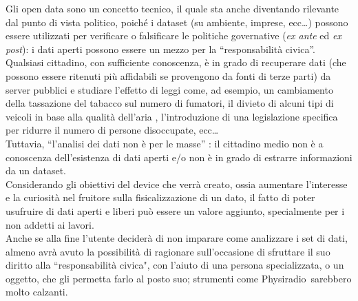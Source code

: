 \documentclass[12pt,a4paper]{report}
\newcommand{\physiradio}{Physiradio} %
\begin{document}
Gli open data sono un concetto tecnico, il quale sta anche diventando rilevante dal punto di vista politico, poiché i dataset (su ambiente, imprese, ecc\dots) possono essere utilizzati per verificare o falsificare le politiche governative (\textit{ex ante} ed \textit{ex post}): i dati aperti possono essere un mezzo per la ``responsabilità civica''. %
Qualsiasi cittadino, con sufficiente conoscenza, è in grado di recuperare dati (che possono essere ritenuti più affidabili se provengono da fonti di terze parti) da server pubblici e studiare l'effetto di leggi come, ad esempio, un cambiamento della tassazione del tabacco sul numero di fumatori, il divieto di alcuni tipi di veicoli in base alla qualità dell'aria \cite{trentini2014lombardy}, l'introduzione di una legislazione specifica per ridurre il numero di persone disoccupate, ecc\dots\ \\


Tuttavia, ``l'analisi dei dati non è per le masse'' \cite{puussaar2018making}: il cittadino medio non è a conoscenza dell'esistenza di dati aperti e/o non è in grado di estrarre informazioni da un dataset. \\

Considerando gli obiettivi del device che verrà creato, ossia aumentare l'interesse e la curiosità nel fruitore sulla fisicalizzazione di un dato, il fatto di poter usufruire di dati aperti e liberi può essere un valore aggiunto, specialmente per i non addetti ai lavori.\\ 
Anche se alla fine l'utente deciderà di non imparare come analizzare i set di dati, almeno avrà avuto la possibilità di ragionare sull'occasione di sfruttare il suo diritto alla ``responsabilità civica", con l'aiuto di una persona specializzata, o un oggetto, che gli permetta farlo al posto suo; strumenti come \physiradio\ sarebbero molto calzanti.



\end{document}
